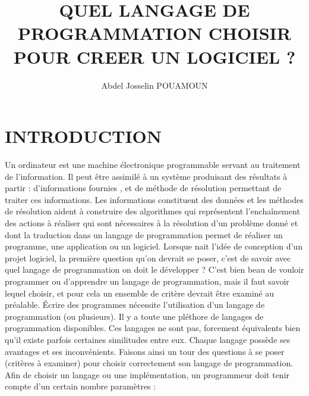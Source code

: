 \documentclass[a4paper,12pt]{article} %
\title{QUEL LANGAGE DE PROGRAMMATION CHOISIR POUR CREER UN LOGICIEL ?} %
\author{Abdel Josselin POUAMOUN} %
\date{} %
\begin{document}
\maketitle %
\section{INTRODUCTION} %
Un ordinateur est une machine électronique programmable servant au traitement de l'information. Il peut être  assimilé à un système produisant des résultats à partir : d'informations fournies , et de méthode de résolution permettant de traiter ces informations.
Les informations constituent des données et les méthodes de résolution aident à construire des algorithmes qui représentent l'enchaînement des actions à réaliser qui sont nécessaires à la résolution d'un problème donné et dont la traduction dans un langage de programmation permet de réaliser un programme, une application ou un logiciel.
Lorsque nait l’idée de conception d’un projet logiciel, la première question qu’on devrait se poser, c’est de savoir avec quel langage de programmation  on doit le développer ? 
C’est bien beau de vouloir programmer ou d’apprendre un langage de programmation, mais il faut savoir lequel choisir, et pour cela un ensemble de  critère devrait être examiné au préalable.
Écrire des programmes nécessite l'utilisation d'un langage de programmation (ou plusieurs). Il y a toute une pléthore de langages de programmation disponibles. Ces langages ne sont pas, forcement équivalents bien qu’il existe parfois certaines similitudes entre eux. Chaque langage possède ses avantages et ses inconvénients.
Faisons ainsi un tour des questions à se poser (critères à examiner) pour choisir correctement son langage de programmation.
Afin de choisir un langage ou une implémentation, un programmeur doit tenir compte d'un certain nombre paramètres :
\end{document}
